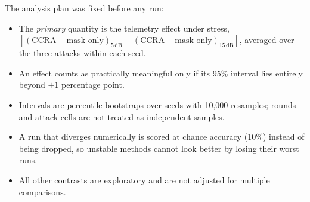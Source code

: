 The analysis plan was fixed before any run:
\begin{itemize}
\item The \emph{primary} quantity is the telemetry effect under stress,
  $[(\text{CCRA}-\text{mask-only})_{5\,\mathrm{dB}}-(\text{CCRA}-\text{mask-only})_{15\,\mathrm{dB}}]$,
  averaged over the three attacks within each seed.
\item An effect counts as practically meaningful only if its 95\% interval lies
  entirely beyond $\pm1$ percentage point.
\item Intervals are percentile bootstraps over seeds with 10{,}000 resamples; rounds
  and attack cells are not treated as independent samples.
\item A run that diverges numerically is scored at chance accuracy (10\%) instead of
  being dropped, so unstable methods cannot look better by losing their worst runs.
\item All other contrasts are exploratory and are not adjusted for multiple
  comparisons.
\end{itemize}

